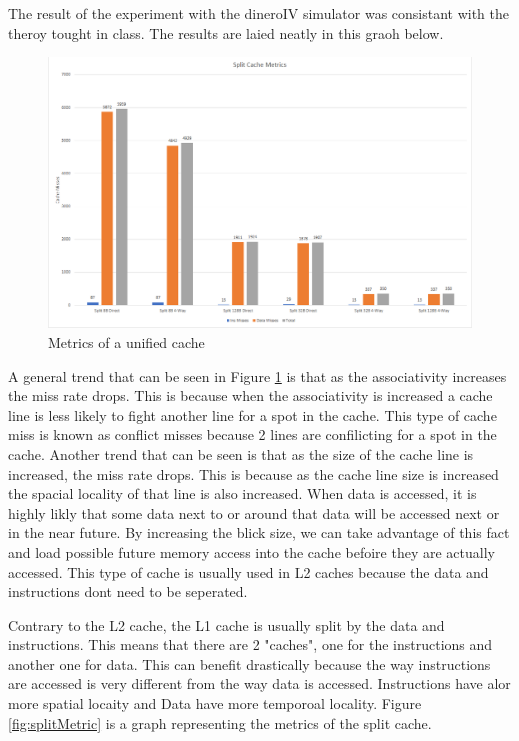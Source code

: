 \documentclass{article}
\begin{document}
		The result of the experiment with the dineroIV simulator was consistant with the theroy tought in class. The results are laied neatly in this graoh below.
		\begin{figure}[H]
			\centering
			\label{fig:uniMetric}
			\includegraphics[width=\textwidth]{uni-cache-metrics.png}
			\caption{Metrics of a unified cache}
		\end{figure}
		A general trend that can be seen in Figure \ref{fig:uniMetric} is that as the associativity increases the miss rate drops. This is because when the associativity is increased a cache line is less likely to fight another line for a spot in the cache. This type of cache miss is known as conflict misses because 2 lines are confilicting for a spot in the cache. Another trend that can be seen is that as the size of the cache line is increased, the miss rate drops. This is because as the cache line size is increased the spacial locality of that line is also increased. When data is accessed, it is highly likly that some data next to or around that data will be accessed next or in the near future. By increasing the blick size, we can take advantage of this fact and load possible future memory access into the cache befoire they are actually accessed. This type of cache is usually used in L2 caches because the data and instructions dont need to be seperated.
		\par
		Contrary to the L2 cache, the L1 cache is usually split by the data and instructions. This means that there are 2 "caches", one for the instructions and another one for data. This can benefit drastically because the way instructions are accessed is very different from the way data is accessed. Instructions have alor more spatial locaity and Data have more temporoal locality. Figure \ref{fig:splitMetric} is a graph representing the metrics of the split cache.
\end{document}
